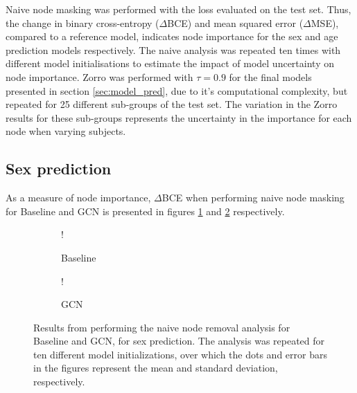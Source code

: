 Naive node masking was performed with the loss evaluated on the test set. Thus, the change in binary cross-entropy ($\Delta$BCE) and mean squared error ($\Delta$MSE), compared to a reference model, indicates node importance for the sex and age prediction models respectively. The naive analysis was repeated ten times with different model initialisations to estimate the impact of model uncertainty on node importance. Zorro was performed with $\tau=0.9$ for the final models presented in section \ref{sec:model_pred}, due to it's computational complexity, but repeated for 25 different sub-groups of the test set. The variation in the Zorro results for these sub-groups represents the uncertainty in the importance for each node when varying subjects.


\subsection{Sex prediction}
\label{sec:results_analysis_sex}
As a measure of node importance, $\Delta$BCE when performing naive node masking for Baseline and GCN is presented in figures \ref{fig:naive_sex_baseline} and \ref{fig:naive_sex_gcn} respectively.

\begin{figure}[H]
    \centering
        \begin{subfigure}{.5\textwidth}
            \centering
            \begin{center}
                \resizebox {1.0\linewidth} {!} {
                    
                }
            \end{center}
            \caption{Baseline}
            \label{fig:naive_sex_baseline}
        \end{subfigure}%
        \begin{subfigure}{.5\textwidth}
            \centering
            \begin{center}
                \resizebox {1.0\linewidth} {!} {
                    
                }
            \end{center}
            \caption{GCN}
            \label{fig:naive_sex_gcn}
        \end{subfigure}
    \caption{Results from performing the naive node removal analysis for Baseline and GCN, for sex prediction. The analysis was repeated for ten different model initializations, over which the dots and error bars in the figures represent the mean and standard deviation, respectively.}
    \label{fig:naive_sex}
\end{figure}

